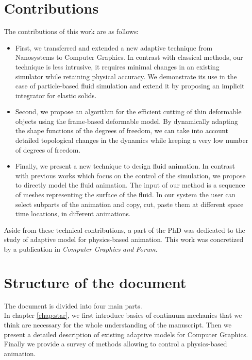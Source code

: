\section{Contributions}
The contributions of this work are as follows:
\begin{itemize}
    \item First, we transferred and extended a new adaptive technique from Nanosystems to Computer Graphics. In contrast with classical methods, our technique is less intrusive, it requires minimal changes in an existing simulator while retaining physical accuracy. We demonstrate its use in the case of particle-based fluid simulation and extend it by proposing an implicit integrator for elastic solids.
    \item Second, we propose an algorithm for the efficient cutting of thin deformable objects using the frame-based deformable model. By dynamically adapting the shape functions of the degrees of freedom, we can take into account detailed topological changes in the dynamics while keeping a very low number of degrees of freedom.
    \item Finally, we present a new technique to design fluid animation. In contrast with previous works which focus on the control of the simulation, we propose to directly model the fluid animation. The input of our method is a sequence of meshes representing the surface of the fluid. In our system the user can select subparts of the animation and copy, cut, paste them at different space time locations, in different animations.
\end{itemize}

Aside from these technical contributions, a part of the PhD was dedicated to the study of adaptive model for physics-based animation. This work was concretized by a publication in \emph{Computer Graphics and Forum.}

\section{Structure of the document}
The document is divided into four main parts. \\

In chapter \ref{chap:star}, we first introduce basics of continuum mechanics that we think are necessary for the whole understanding of the manuscript. Then we present a detailed description of existing adaptive models for Computer Graphics. Finally we provide a survey of methods allowing to control a physics-based animation. \\

